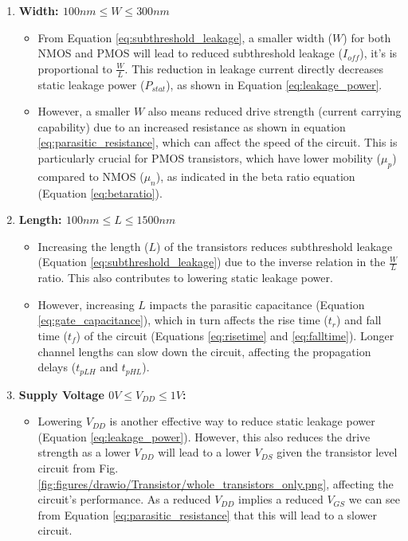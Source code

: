 \begin{enumerate}
    \item \textbf{Width: $100nm\leq W \leq 300nm$}
    \begin{itemize}
        \item From Equation \ref{eq:subthreshold_leakage}, a smaller width ($W$) for both NMOS and PMOS will lead to reduced subthreshold leakage (\(I_{off}\)), it's is proportional to $\frac{W}{L}$. This reduction in leakage current directly decreases static leakage power (\(P_{stat}\)), as shown in Equation \ref{eq:leakage_power}.
        \item However, a smaller $W$ also means reduced drive strength (current carrying capability) due to an increased resistance as shown in equation \ref{eq:parasitic_resistance}, which can affect the speed of the circuit. This is particularly crucial for PMOS transistors, which have lower mobility (\(\mu_p\)) compared to NMOS (\(\mu_n\)), as indicated in the beta ratio equation (Equation \ref{eq:betaratio}).
    \end{itemize}

    \item \textbf{Length: $100nm\leq L \leq 1500nm$}
    \begin{itemize}
        \item Increasing the length ($L$) of the transistors reduces subthreshold leakage (Equation \ref{eq:subthreshold_leakage}) due to the inverse relation in the $\frac{W}{L}$ ratio. This also contributes to lowering static leakage power.
        \item However, increasing $L$ impacts the parasitic capacitance (Equation \ref{eq:gate_capacitance}), which in turn affects the rise time ($t_r$) and fall time ($t_f$) of the circuit (Equations \ref{eq:risetime} and \ref{eq:falltime}). Longer channel lengths can slow down the circuit, affecting the propagation delays ($t_{pLH}$ and $t_{pHL}$).
    \end{itemize}


    \item \textbf{Supply Voltage $0V\leq V_{DD}\leq 1V$:}
    \begin{itemize}
        \item Lowering $V_{DD}$ is another effective way to reduce static leakage power (Equation \ref{eq:leakage_power}). However, this also reduces the drive strength as a lower $V_{DD}$ will lead to a lower $V_{DS}$ given the transistor level circuit from Fig. \ref{fig:figures/drawio/Transistor/whole_transistors_only.png}, affecting the circuit's performance. As a reduced $V_{DD}$ implies a reduced $V_{GS}$ we can see from Equation \ref{eq:parasitic_resistance} that this will lead to a slower circuit.
    \end{itemize}


\end{enumerate}
